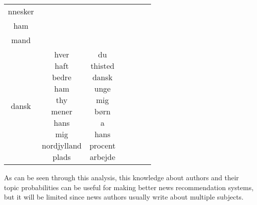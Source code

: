 \begin{table*}[h]
\begin{tabular}{c|c|c|c|c|c|c}
nnesker \\ ham \\ mand \\ dansk} & \makecell{hver \\ haft \\ bedre \\ ham \\ thy \\ mener \\ hans \\ mig \\ nordjylland \\ plads} & \makecell{du \\ thisted \\ dansk \\ unge \\ mig \\ børn \\ a \\ hans \\ procent \\ arbejde} \\
		\bottomrule
	\end{tabular}
	\label{tab:author_top_words}
\end{table*}

As can be seen through this analysis, this knowledge about authors and their topic probabilities can be useful for making better news recommendation systems, but it will be limited since news authors usually write about multiple subjects.
